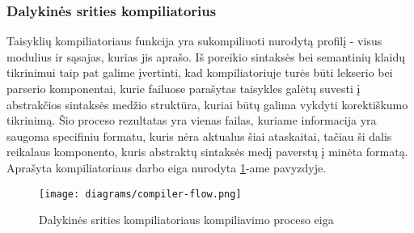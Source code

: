 \begin{activities}
{        \subsubsection{Dalykinės srities kompiliatorius}

        Taisyklių kompiliatoriaus funkcija yra sukompiliuoti nurodytą profilį - visus modulius ir sąsajas, kurias jis aprašo. Iš poreikio sintaksės bei semantinių klaidų tikrinimui taip pat galime įvertinti, kad kompiliatoriuje turės būti lekserio bei parserio komponentai, kurie failuose parašytas taisykles galėtų suvesti į abstrakčios sintaksės medžio struktūra, kuriai būtų galima vykdyti korektiškumo tikrinimą. Šio proceso rezultatas yra vienas failas, kuriame informacija yra saugoma specifiniu formatu, kuris nėra aktualus šiai ataskaitai, tačiau ši dalis reikalaus komponento, kuris abstraktų sintaksės medį paverstų į minėta formatą. Aprašyta kompiliatoriaus darbo eiga nurodyta \ref{fig:compiler-flow}-ame pavyzdyje.

        \begin{figure}
            \centering
            \texttt{[image: diagrams/compiler-flow.png]}
            \caption{Dalykinės srities kompiliatoriaus kompiliavimo proceso eiga}
            \label{fig:compiler-flow}
        \end{figure}
    }
    \rezultatai{

    } \row


\end{activities}